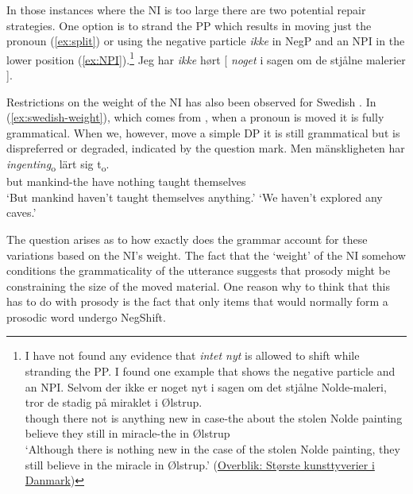 \documentclass[12pt, letterpaper]{article}
\begin{document}
In those instances where the NI is too large there are two potential repair strategies. One option is to strand the PP which results in moving just the pronoun (\ref{ex:split}) or using the negative particle \textit{ikke} in NegP and an NPI in the lower position (\ref{ex:NPI}).\footnote{I have not found any evidence that \emph{intet nyt} is allowed to shift while stranding the PP. I found one example that shows the negative particle and an NPI. 
\ea
\gll Selvom der ikke er noget nyt i sagen om det stjålne Nolde-maleri, tror de stadig på miraklet i Ølstrup.\\
though there not is anything new in case-the about the stolen {Nolde painting} believe they still in miracle-the in Ølstrup\\
\glt `Although there is nothing new in the case of the stolen Nolde painting, they still believe in the miracle in Ølstrup.' \hfill (\href{https://www.tvmidtvest.dk/midt-og-vestjylland/overblik-storste-kunsttyverier-i-danmark}{Overblik: Største kunsttyverier i Danmark})
\z}
	\ea 
		\ex Jeg har \textit{ikke} hørt [ \textit{noget} i sagen om de stjålne malerier ]. \label{ex:NPI}
		\z 
	\z  

Restrictions on the weight of the NI has also been observed for Swedish \citep{penkaNegativeIndefinites2011}. In (\ref{ex:swedish-weight}), which comes from \citet{penkaNegativeIndefinites2011}, when a pronoun is moved it is fully grammatical. When we, however, move a simple DP it is still grammatical but is dispreferred or degraded, indicated by the question mark. 
	\ea \label{ex:swedish-weight}
		\ea 
		{\gll Men mänskligheten har \textit{ingenting}\textsubscript{o} lärt sig t\textsubscript{o}.\\
		but mankind-the have nothing taught themselves\\}
		\glt `But mankind haven't taught themselves anything.'
		\glt `We haven't explored any caves.'
		\z 
	\z 

The question arises as to how exactly does the grammar account for these variations based on the NI's weight. The fact that the `weight' of the NI somehow conditions the grammaticality of the utterance suggests that prosody might be constraining the size of the moved material. One reason why to think that this has to do with prosody is the fact that only items that would normally form a prosodic word undergo NegShift. 
\end{document}
